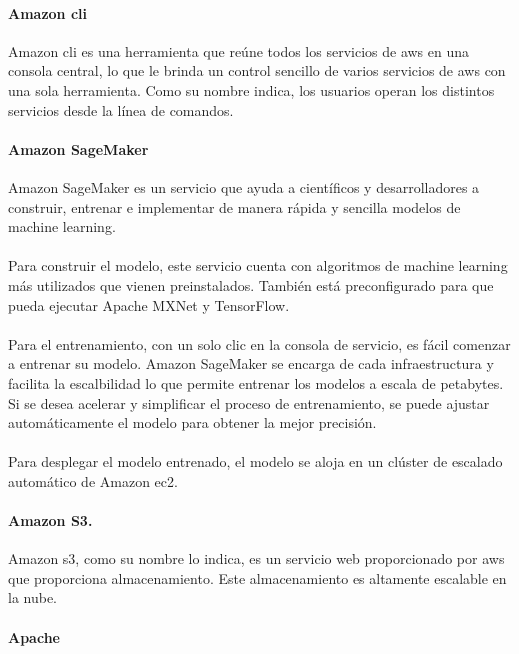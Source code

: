 \documentclass[12pt, a4paper, titlepage]{report}
\begin{document}
	   	\paragraph{Amazon \acrshort{cli} \\}
	   	
	   	Amazon \acrfull{cli} es una herramienta que reúne todos los servicios de \acrshort{aws} en una consola central, lo que le brinda un control sencillo de varios servicios de \acrshort{aws} con una sola herramienta. Como su nombre indica, los usuarios operan los distintos servicios desde la línea de comandos. 
	   	
	   	\paragraph{Amazon SageMaker \\}
	   	Amazon SageMaker es un servicio que ayuda a científicos y desarrolladores a construir, entrenar e implementar de manera rápida y sencilla modelos de machine learning.\\\\
	   	Para construir el modelo, este servicio cuenta con algoritmos de machine learning más utilizados que vienen preinstalados. También está preconfigurado para que pueda ejecutar Apache MXNet y TensorFlow.\\\\
	   	Para el entrenamiento, con un solo clic en la consola de servicio, es fácil comenzar a entrenar su modelo. Amazon SageMaker se encarga de cada infraestructura y facilita la escalbilidad lo que permite entrenar los modelos a escala de petabytes. Si se desea acelerar y simplificar el proceso de entrenamiento, se puede ajustar automáticamente el modelo para obtener la mejor precisión.\\\\
	   	Para desplegar el modelo entrenado, el modelo se aloja en un clúster de escalado automático de Amazon \acrshort{ec2}.		
	   	\newpage	
	   	\paragraph{Amazon S3. \\}
	   	Amazon \acrfull{s3}, como su nombre lo indica, es un servicio web proporcionado por \acrfull{aws} que proporciona almacenamiento. Este almacenamiento es altamente escalable en la nube. 
	   	
	   	\paragraph{Apache \\}
	   	
\end{document}
